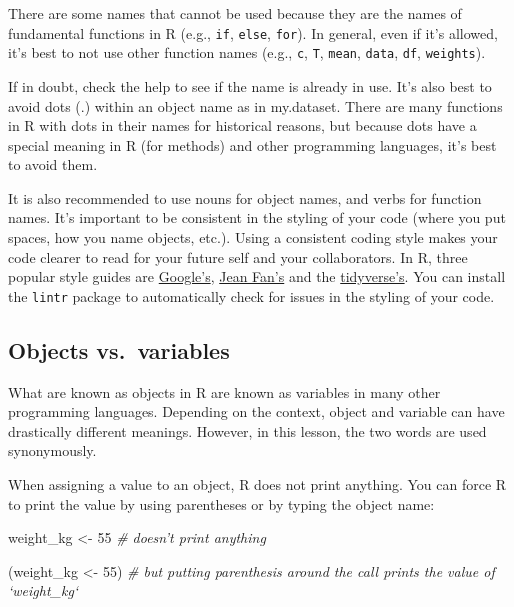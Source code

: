 \documentclass[]{book}
\newenvironment{Shaded}{\begin{snugshade}}{\end{snugshade}}
\newcommand{\CommentTok}[1]{\textcolor[rgb]{0.56,0.35,0.01}{\textit{#1}}}
\newcommand{\DecValTok}[1]{\textcolor[rgb]{0.00,0.00,0.81}{#1}}
\newcommand{\NormalTok}[1]{#1}
\newcommand{\StringTok}[1]{\textcolor[rgb]{0.31,0.60,0.02}{#1}}
\begin{document}
There are some names that cannot be used because they are the names of fundamental functions in R (e.g., \texttt{if}, \texttt{else}, \texttt{for}). In general, even if it's allowed, it's best to not use other function names (e.g., \texttt{c}, \texttt{T}, \texttt{mean}, \texttt{data}, \texttt{df}, \texttt{weights}).

If in doubt, check the help to see if the name is already in use. It's also best to avoid dots (.) within an object name as in my.dataset. There are many functions in R with dots in their names for historical reasons, but because dots have a special meaning in R (for methods) and other programming languages, it's best to avoid them.

It is also recommended to use nouns for object names, and verbs for function names. It's important to be consistent in the styling of your code (where you put spaces, how you name objects, etc.). Using a consistent coding style makes your code clearer to read for your future self and your collaborators. In R, three popular style guides are \href{https://google.github.io/styleguide/Rguide.html}{Google's}, \href{\%5Bhttp://jef.works/R-style-guide/}{Jean Fan's} and the \href{https://style.tidyverse.org/}{tidyverse's}. You can install the \texttt{lintr} package to automatically check for issues in the styling of your code.

\hypertarget{objects-vs.variables}{%
\subsection{Objects vs.~variables}\label{objects-vs.variables}}

What are known as objects in R are known as variables in many other programming languages. Depending on the context, object and variable can have drastically different meanings. However, in this lesson, the two words are used synonymously.

When assigning a value to an object, R does not print anything. You can force R to print the value by using parentheses or by typing the object name:

\begin{Shaded}
\begin{Highlighting}[]
\NormalTok{weight_kg <-}\StringTok{ }\DecValTok{55}  \CommentTok{# doesn't print anything}
\end{Highlighting}
\end{Shaded}

\begin{Shaded}
\begin{Highlighting}[]
\NormalTok{(weight_kg <-}\StringTok{ }\DecValTok{55}\NormalTok{)  }\CommentTok{# but putting parenthesis around the call prints the value of `weight_kg`}
\end{Highlighting}
\end{Shaded}
\end{document}
